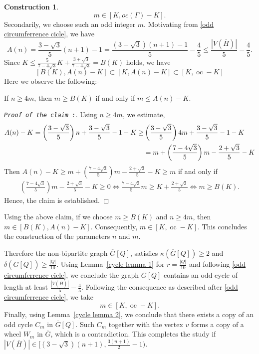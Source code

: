 \documentclass[reqno,10pt]{amsart}
\theoremstyle{definition}
\newtheorem{construction}[theorem]{Construction}
\begin{document}
\begin{construction}
\begin{equation*}
m\in[K, oc(\Gamma)-K].
\end{equation*}
Secondarily, we choose such an odd integer $m$. Motivating from \eqref{odd circumferrence cicle}, we have
\begin{equation*}
A(n)=\frac{3-\sqrt{3}}{5}(n+1)-1=\frac{(3-\sqrt{3})(n+1)-1}{5}-\frac{4}{5}\leq\frac{|V(\overline{H})|}{5}-\frac{4}{5}.    
\end{equation*}
Since $K\leq \frac{5}{7-4\sqrt{3}}K+\frac{3+\sqrt3}{7-4\sqrt{3}}=B(K)$ holds, we have 
\begin{equation*}
\left[B(K),A(n)-K\right]\subset\left[K,A(n)-K\right]\subset\left[K, \mathop{oc(\overline{G}[Q])}-K\right]
\end{equation*}
Here we observe the following:-

  If $n\geq 4m$, then $m\geq B(K)$ if and only if $m\leq A(n)-K$. 
\begin{proof}[\tt{Proof of the claim} :]\renewcommand{\qedsymbol}{}
Using $n\geq 4m$, we estimate,
\begin{align*}
A(n)-K=\left(\frac{3-\sqrt{3}}{5}\right)n+\frac{3-\sqrt{3}}{5}-1-K\geq&\left(\frac{3-\sqrt{3}}{5}\right)4m+\frac{3-\sqrt{3}}{5}-1-K\notag\\
&=m+\left(\frac{7-4\sqrt{3}}{5}\right)m-\frac{2+\sqrt{3}}{5}-K
\end{align*}
Then 
$A(n)-K\geq m+\left(\frac{7-4\sqrt{3}}{5}\right)m-\frac{2+\sqrt{3}}{5}-K\geq m$ if and only if 
\begin{align*}
\left(\frac{7-4\sqrt{3}}{5}\right)m-\frac{2+\sqrt{3}}{5}-K\geq0\Leftrightarrow \frac{7-4\sqrt{3}}{5}m\geq K+\frac{2+\sqrt{3}}{5}\Leftrightarrow m\geq B(K).
\end{align*}
Hence, the claim is established. 
\end{proof}	
\noindent Using the above claim, if we choose $m\geq B(K)$ and $n\geq 4m$, then $m\in\left[B(K),A(n)-K\right]$. Consequently, $m\in\left[K, \mathop{oc(\overline{G}[Q])}-K\right]$. This concludes the construction of the parameters $n$ and $m$.
\end{construction}

 Therefore the non-bipartite graph $\overline{G}[Q]$, satisfies $\kappa(\overline{G}[Q])\geq 2$ and $\delta(\overline{G}[Q])\geq \frac{|Q|}{10}$. Using Lemma~\ref{cycle lemma 1} for $r=\frac{|Q|}{10}$ and following \eqref{odd circumferrence cicle}, we conclude the graph $\overline{G}[Q]$ contains an odd cycle of length at least $\frac{|V(\overline{H})|}{5}-\frac{4}{5}$. Following the consequence as described after \eqref{odd circumferrence cicle}, we take 
\begin{equation*}
 m\in\left[K, \mathop{oc(\overline{G}[Q])}-K\right].   
\end{equation*}
Finally, using Lemma~\ref{cycle lemma 2}, we conclude that there exists a copy of an odd cycle $C_{m}$ in $\overline{G}[Q]$. Such $C_{m}$ together with the vertex $v$ forms a copy of a wheel $W_{m}$ in $\overline{G}$, which is a contradiction. This completes the study if $|V(\overline{H})|\in [(3-\sqrt{3})(n+1), \frac{3(n+1)}{2}-1)$. 
\end{document}
